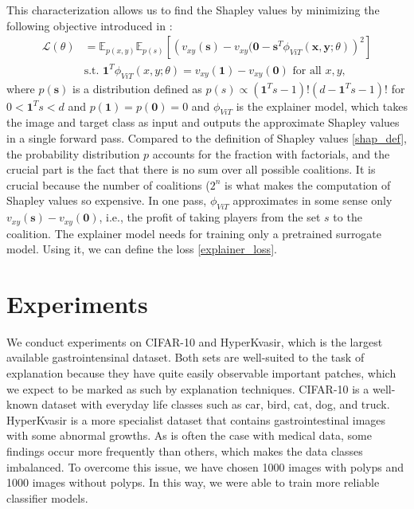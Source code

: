 \documentclass[magisterska,en]{pracamgr}
\begin{document}
This characterization allows us to find the Shapley values by minimizing the following objective introduced in \cite{DBLP:conf/iclr/JethaniSCLR22}:
\begin{equation}
    \begin{split}
        \mathcal{L}(\theta) &= \mathbb{E}_{p(x,y)} \mathbb{E}_{p(s)}  \left[\left(v_{xy}(\mathbf{s})-v_{xy}(\mathbf{0} -\mathbf{s}^T \phi _{ViT}(\mathbf{x},\mathbf{y};\theta)\right)^2\right]
        \\
        &    \textrm{s.t.  } \mathbf{1}^T \phi _{ViT}(x,y;\theta) = v_{xy}(\mathbf{1}) - v_{xy}(\mathbf{0}) \textrm{    for all   } x,y,
    \end{split}
\label{explainer_loss}\end{equation}
where $p(\mathbf{s})$ is a distribution defined as $p(s) \propto (\mathbf{1}^Ts - 1)! (d - \mathbf{1}^Ts -1)!$ for $0 < \mathbf{1}^Ts < d$ and $p(\mathbf{1}) = p(\mathbf{0}) = 0$ and $\phi _{ViT}$ is the explainer model, which takes the image and target class as input and outputs the approximate Shapley values in a single forward pass. Compared to the definition of Shapley values \ref{shap_def}, the probability distribution $p$ accounts for the fraction with factorials, and the crucial part is the fact that there is no sum over all possible coalitions. It is crucial because the number of coalitions ($2^n$ is what makes the computation of Shapley values so expensive. In one pass, $\phi _{ViT}$ approximates in some sense only $v_{xy}(\mathbf{s})-v_{xy}(\mathbf{0})$, i.e., the profit of taking players from the set $s$ to the coalition. The explainer model needs for training only a pretrained surrogate model. Using it, we can define the loss \ref{explainer_loss}.




\chapter{Experiments}\label{r:experiments}
We conduct experiments on CIFAR-10 and HyperKvasir, which is the largest available gastrointensinal dataset. Both sets are well-suited to the task of explanation because they have quite easily observable important patches, which we expect to be marked as such by explanation techniques. CIFAR-10 is a well-known dataset with everyday life classes such as car, bird, cat, dog, and truck.
HyperKvasir is a more specialist dataset that contains gastrointestinal images with some abnormal growths.
As is often the case with medical data, some findings occur more frequently than others, which makes the data classes imbalanced. To overcome this issue, we have chosen 1000 images with polyps and 1000 images without polyps. In this way, we were able to train more reliable classifier models.
\end{document}
